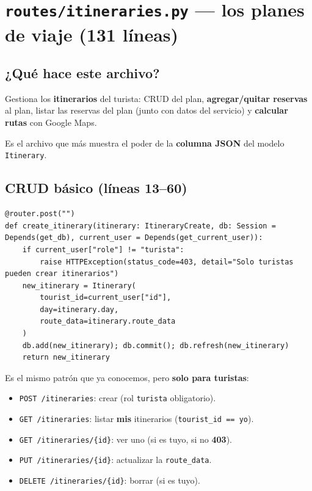 \documentclass[11pt,a4paper]{article}
\begin{document}
\section{\texttt{routes/itineraries.py} --- los planes de viaje (131 líneas)}

\subsection{¿Qué hace este archivo?}

Gestiona los \textbf{itinerarios} del turista: CRUD del plan, \textbf{agregar/quitar reservas} al
plan, listar las reservas del plan (junto con datos del servicio) y \textbf{calcular rutas}
con Google Maps.

Es el archivo que más muestra el poder de la \textbf{columna JSON} del modelo \texttt{Itinerary}.

\subsection{CRUD básico (líneas 13--60)}

\begin{lstlisting}
@router.post("")
def create_itinerary(itinerary: ItineraryCreate, db: Session = Depends(get_db), current_user = Depends(get_current_user)):
    if current_user["role"] != "turista":
        raise HTTPException(status_code=403, detail="Solo turistas pueden crear itinerarios")
    new_itinerary = Itinerary(
        tourist_id=current_user["id"],
        day=itinerary.day,
        route_data=itinerary.route_data
    )
    db.add(new_itinerary); db.commit(); db.refresh(new_itinerary)
    return new_itinerary
\end{lstlisting}

Es el mismo patrón que ya conocemos, pero \textbf{solo para turistas}:
\begin{itemize}
    \item \texttt{POST /itineraries}: crear (rol \texttt{turista} obligatorio).
    \item \texttt{GET /itineraries}: listar \textbf{mis} itinerarios (\texttt{tourist\_id == yo}).
    \item \texttt{GET /itineraries/\{id\}}: ver uno (si es tuyo, si no \textbf{403}).
    \item \texttt{PUT /itineraries/\{id\}}: actualizar la \texttt{route\_data}.
    \item \texttt{DELETE /itineraries/\{id\}}: borrar (si es tuyo).
\end{itemize}
\end{document}

